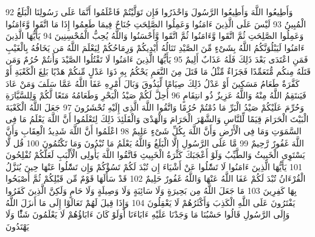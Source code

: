 {\tiny\colorbox{cl_aya}{92}} وَأَطِيعُوا اللَّهَ وَأَطِيعُوا الرَّسُولَ وَاحْذَرُوا فَإِن تَوَلَّيْتُمْ فَاعْلَمُوا أَنَّمَا عَلَى رَسُولِنَا الْبَلَغُ الْمُبِينُ
{\tiny\colorbox{cl_aya}{93}} لَيْسَ عَلَى الَّذِينَ ءَامَنُوا وَعَمِلُوا الصَّلِحَتِ جُنَاحٌ فِيمَا طَعِمُوا إِذَا مَا اتَّقَوا وَّءَامَنُوا وَعَمِلُوا الصَّلِحَتِ ثُمَّ اتَّقَوا وَّءَامَنُوا ثُمَّ اتَّقَوا وَّأَحْسَنُوا وَاللَّهُ يُحِبُّ الْمُحْسِنِينَ
{\tiny\colorbox{cl_aya}{94}} يَأَيُّهَا الَّذِينَ ءَامَنُوا لَيَبْلُوَنَّكُمُ اللَّهُ بِشَىْءٍ مِّنَ الصَّيْدِ تَنَالُهُ أَيْدِيكُمْ وَرِمَاحُكُمْ لِيَعْلَمَ اللَّهُ مَن يَخَافُهُ بِالْغَيْبِ فَمَنِ اعْتَدَى بَعْدَ ذَلِكَ فَلَهُ عَذَابٌ أَلِيمٌ
{\tiny\colorbox{cl_aya}{95}} يَأَيُّهَا الَّذِينَ ءَامَنُوا لَا تَقْتُلُوا الصَّيْدَ وَأَنتُمْ حُرُمٌ وَمَن قَتَلَهُ مِنكُم مُّتَعَمِّدًا فَجَزَاءٌ مِّثْلُ مَا قَتَلَ مِنَ النَّعَمِ يَحْكُمُ بِهِ ذَوَا عَدْلٍ مِّنكُمْ هَدْيًا بَلِغَ الْكَعْبَةِ أَوْ كَفَّرَةٌ طَعَامُ مَسَكِينَ أَوْ عَدْلُ ذَلِكَ صِيَامًا لِّيَذُوقَ وَبَالَ أَمْرِهِ عَفَا اللَّهُ عَمَّا سَلَفَ وَمَنْ عَادَ فَيَنتَقِمُ اللَّهُ مِنْهُ وَاللَّهُ عَزِيزٌ ذُو انتِقَامٍ
{\tiny\colorbox{cl_aya}{96}} أُحِلَّ لَكُمْ صَيْدُ الْبَحْرِ وَطَعَامُهُ مَتَعًا لَّكُمْ وَلِلسَّيَّارَةِ وَحُرِّمَ عَلَيْكُمْ صَيْدُ الْبَرِّ مَا دُمْتُمْ حُرُمًا وَاتَّقُوا اللَّهَ الَّذِى إِلَيْهِ تُحْشَرُونَ
{\tiny\colorbox{cl_aya}{97}} جَعَلَ اللَّهُ الْكَعْبَةَ الْبَيْتَ الْحَرَامَ قِيَمًا لِّلنَّاسِ وَالشَّهْرَ الْحَرَامَ وَالْهَدْىَ وَالْقَلَئِدَ ذَلِكَ لِتَعْلَمُوا أَنَّ اللَّهَ يَعْلَمُ مَا فِى السَّمَوَتِ وَمَا فِى الْأَرْضِ وَأَنَّ اللَّهَ بِكُلِّ شَىْءٍ عَلِيمٌ
{\tiny\colorbox{cl_aya}{98}} اعْلَمُوا أَنَّ اللَّهَ شَدِيدُ الْعِقَابِ وَأَنَّ اللَّهَ غَفُورٌ رَّحِيمٌ
{\tiny\colorbox{cl_aya}{99}} مَّا عَلَى الرَّسُولِ إِلَّا الْبَلَغُ وَاللَّهُ يَعْلَمُ مَا تُبْدُونَ وَمَا تَكْتُمُونَ
{\tiny\colorbox{cl_aya}{100}} قُل لَّا يَسْتَوِى الْخَبِيثُ وَالطَّيِّبُ وَلَوْ أَعْجَبَكَ كَثْرَةُ الْخَبِيثِ فَاتَّقُوا اللَّهَ يَأُولِى الْأَلْبَبِ لَعَلَّكُمْ تُفْلِحُونَ
{\tiny\colorbox{cl_aya}{101}} يَأَيُّهَا الَّذِينَ ءَامَنُوا لَا تَسَْٔلُوا عَنْ أَشْيَاءَ إِن تُبْدَ لَكُمْ تَسُؤْكُمْ وَإِن تَسَْٔلُوا عَنْهَا حِينَ يُنَزَّلُ الْقُرْءَانُ تُبْدَ لَكُمْ عَفَا اللَّهُ عَنْهَا وَاللَّهُ غَفُورٌ حَلِيمٌ
{\tiny\colorbox{cl_aya}{102}} قَدْ سَأَلَهَا قَوْمٌ مِّن قَبْلِكُمْ ثُمَّ أَصْبَحُوا بِهَا كَفِرِينَ
{\tiny\colorbox{cl_aya}{103}} مَا جَعَلَ اللَّهُ مِن بَحِيرَةٍ وَلَا سَائِبَةٍ وَلَا وَصِيلَةٍ وَلَا حَامٍ وَلَكِنَّ الَّذِينَ كَفَرُوا يَفْتَرُونَ عَلَى اللَّهِ الْكَذِبَ وَأَكْثَرُهُمْ لَا يَعْقِلُونَ
{\tiny\colorbox{cl_aya}{104}} وَإِذَا قِيلَ لَهُمْ تَعَالَوْا إِلَى مَا أَنزَلَ اللَّهُ وَإِلَى الرَّسُولِ قَالُوا حَسْبُنَا مَا وَجَدْنَا عَلَيْهِ ءَابَاءَنَا أَوَلَوْ كَانَ ءَابَاؤُهُمْ لَا يَعْلَمُونَ شَئًْا وَلَا يَهْتَدُونَ
